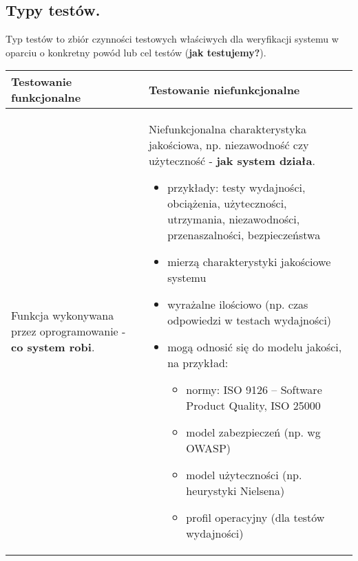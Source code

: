 \documentclass[../main.tex]{subfiles}
\begin{document}
    \subsection{Typy testów.}

    Typ testów to zbiór czynności testowych właściwych dla weryfikacji systemu
    w oparciu o konkretny powód lub cel testów (\textbf{jak testujemy?}).

    \begin{table}[H]
        \begin{center}
            \begin{tabular}{| p{8cm}| p{8cm}|}
                \hline
                \textbf{Testowanie funkcjonalne} & \textbf{Testowanie niefunkcjonalne}\\
                \hline
                Funkcja wykonywana przez oprogramowanie - \textbf{co system robi}.
                &
                Niefunkcjonalna charakterystyka jakościowa, np. niezawodność
                czy użyteczność - \textbf{jak system działa}.
                \begin{itemize}
                    \item przykłady: testy wydajności, obciążenia, użyteczności, utrzymania,
                    niezawodności, przenaszalności, bezpieczeństwa
                    \item mierzą charakterystyki jakościowe systemu
                    \item wyrażalne ilościowo (np. czas odpowiedzi w testach wydajności)
                    \item mogą odnosić się do modelu jakości, na przykład:
                    \begin{itemize}
                        \item normy: ISO 9126 – Software Product Quality, ISO 25000
                        \item model zabezpieczeń (np. wg OWASP)
                        \item model użyteczności (np. heurystyki Nielsena)
                        \item profil operacyjny (dla testów wydajności)
                    \end{itemize}
                \end{itemize}\\
                \hline
            \end{tabular}
        \end{center}
    \end{table}
\end{document}
